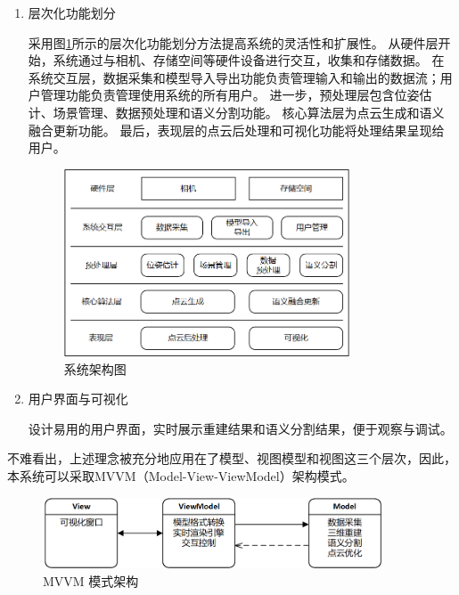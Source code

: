 \begin{enumerate}
	\item{层次化功能划分}
	\par 采用图\ref{fig:architecture}所示的层次化功能划分方法提高系统的灵活性和扩展性。
	从硬件层开始，系统通过与相机、存储空间等硬件设备进行交互，收集和存储数据。
	在系统交互层，数据采集和模型导入导出功能负责管理输入和输出的数据流；用户管理功能负责管理使用系统的所有用户。
	进一步，预处理层包含位姿估计、场景管理、数据预处理和语义分割功能。
	核心算法层为点云生成和语义融合更新功能。
	最后，表现层的点云后处理和可视化功能将处理结果呈现给用户。

	\begin{figure}[htb]
		\centering
		\includegraphics[width=0.8\textwidth]{figures/uml/architect.png}
		\caption{系统架构图}
		\label{fig:architecture}
	\end{figure}

	\item{用户界面与可视化}
	\par 设计易用的用户界面，实时展示重建结果和语义分割结果，便于观察与调试。
\end{enumerate}

\par 不难看出，上述理念被充分地应用在了模型、视图模型和视图这三个层次，因此，本系统可以采取MVVM（Model-View-ViewModel）架构模式。

\begin{figure}[htb]
	\centering
	\includegraphics[width=0.9\textwidth]{figures/uml/mvvm_pattern.png}
	\caption{MVVM 模式架构}
	\label{fig:mvvm_pattern}
\end{figure}

